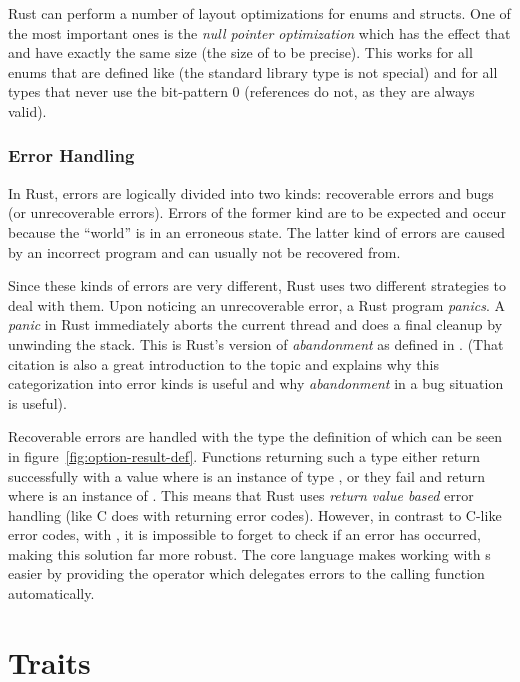 Rust can perform a number of layout optimizations for enums and structs.
One of the most important ones is the \emph{null pointer optimization} which has the effect that  and  have exactly the same size (the size of  to be precise).
This works for all enums that are defined like  (the standard library type is not special) and for all types that never use the bit-pattern 0 (references do not, as they are always valid).


\subsubsection*{Error Handling}

In Rust, errors are logically divided into two kinds: recoverable errors and bugs (or unrecoverable errors).
Errors of the former kind are to be expected and occur because the \enquote{world} is in an erroneous state.
The latter kind of errors are caused by an incorrect program and can usually not be recovered from.

Since these kinds of errors are very different, Rust uses two different strategies to deal with them.
Upon noticing an unrecoverable error, a Rust program \emph{panics}.
A \emph{panic} in Rust immediately aborts the current thread and does a final cleanup by unwinding the stack.
This is Rust's version of \emph{abandonment} as defined in \cite{duffy2016error}.
(That citation is also a great introduction to the topic and explains why this categorization into error kinds is useful and why \emph{abandonment} in a bug situation is useful).

Recoverable errors are handled with the  type the definition of which can be seen in figure~\ref{fig:option-result-def}.
Functions returning such a type either return successfully with a value  where  is an instance of type , or they fail and return  where  is an instance of .
This means that Rust uses \emph{return value based} error handling (like C does with returning error codes).
However, in contrast to C-like error codes, with , it is impossible to forget to check if an error has occurred, making this solution far more robust.
The core language makes working with s easier by providing the  operator which delegates errors to the calling function automatically.

\vfill
\section{Traits}

